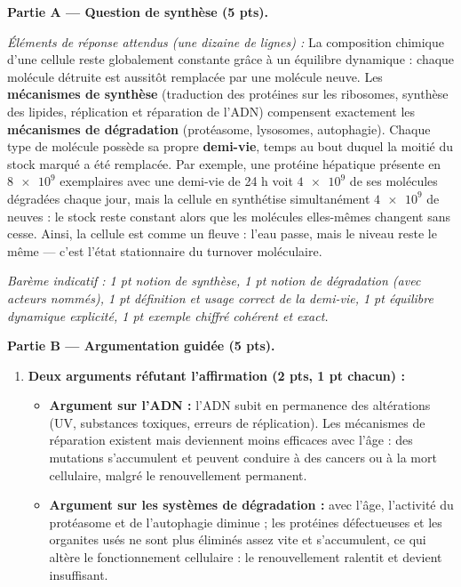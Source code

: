 \documentclass[11pt]{article}
\newcommand{\cle}[1]{{\popxbold\color{popdark}#1}}
\begin{document}
\begin{corrige}
\textbf{Partie A — Question de synthèse (5 pts).}

\emph{Éléments de réponse attendus (une dizaine de lignes) :}
La composition chimique d'une cellule reste globalement constante grâce à un \cle{équilibre dynamique} : chaque molécule détruite est aussitôt remplacée par une molécule neuve. Les \textbf{mécanismes de synthèse} (traduction des protéines sur les ribosomes, synthèse des lipides, réplication et réparation de l'ADN) compensent exactement les \textbf{mécanismes de dégradation} (protéasome, lysosomes, autophagie). Chaque type de molécule possède sa propre \textbf{demi-vie}, temps au bout duquel la moitié du stock marqué a été remplacée. Par exemple, une protéine hépatique présente en $\num{8e9}$ exemplaires avec une demi-vie de 24 h voit $\num{4e9}$ de ses molécules dégradées chaque jour, mais la cellule en synthétise simultanément $\num{4e9}$ de neuves : le stock reste constant alors que les molécules elles-mêmes changent sans cesse. Ainsi, la cellule est comme un fleuve : l'eau passe, mais le niveau reste le même — c'est l'état stationnaire du turnover moléculaire.

\emph{Barème indicatif : 1 pt notion de synthèse, 1 pt notion de dégradation (avec acteurs nommés), 1 pt définition et usage correct de la demi-vie, 1 pt équilibre dynamique explicité, 1 pt exemple chiffré cohérent et exact.}

\textbf{Partie B — Argumentation guidée (5 pts).}

\begin{enumerate}
\item \textbf{Deux arguments réfutant l'affirmation (2 pts, 1 pt chacun) :}
\begin{itemize}
\item \textbf{Argument sur l'ADN :} l'ADN subit en permanence des altérations (UV, substances toxiques, erreurs de réplication). Les mécanismes de réparation existent mais deviennent moins efficaces avec l'âge : des mutations s'accumulent et peuvent conduire à des cancers ou à la mort cellulaire, malgré le renouvellement permanent.
\item \textbf{Argument sur les systèmes de dégradation :} avec l'âge, l'activité du protéasome et de l'autophagie diminue ; les protéines défectueuses et les organites usés ne sont plus éliminés assez vite et s'accumulent, ce qui altère le fonctionnement cellulaire : le renouvellement ralentit et devient insuffisant.
\end{itemize}


\end{enumerate}
\end{corrige}
\end{document}
